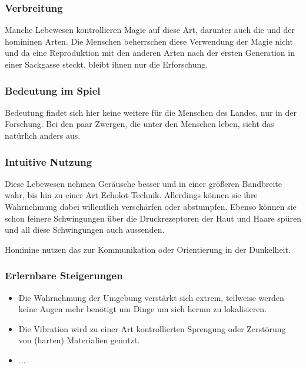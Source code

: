 \subsubsection{Verbreitung}
Manche Lebewesen kontrollieren Magie auf diese Art, darunter auch die  und  der homininen Arten. Die Menschen beherrschen diese Verwendung der Magie nicht und da eine Reproduktion mit den anderen Arten nach der ersten Generation in einer Sackgasse steckt, bleibt ihnen nur die Erforschung.

\subsubsection{Bedeutung im Spiel}
Bedeutung findet sich hier keine weitere für die Menschen des Landes, nur in der Forschung. 
Bei den paar Zwergen, die unter den Menschen leben, sieht das natürlich anders aus.

\subsubsection{Intuitive Nutzung}
Diese Lebewesen nehmen Geräusche besser und in einer größeren Bandbreite wahr, bis hin zu einer Art Echolot-Technik. 
Allerdings können sie ihre Wahrnehmung dabei willentlich verschärfen oder abstumpfen. 
Ebenso können sie schon feinere Schwingungen über die Druckrezeptoren der Haut und Haare spüren und all diese Schwingungen auch aussenden.

Hominine nutzen das zur Kommunikation oder Orientierung in der Dunkelheit. 

\subsubsection{Erlernbare Steigerungen}
\begin{itemize}
	\item Die Wahrnehmung der Umgebung verstärkt sich extrem, teilweise werden keine Augen mehr benötigt um Dinge um sich herum zu lokalisieren. 
	\item Die Vibration wird zu einer Art kontrollierten Sprengung oder Zerstörung von (harten) Materialien genutzt.
	\item ...
\end{itemize}

